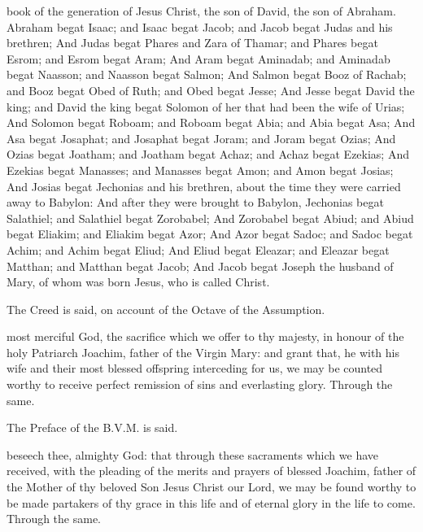  book of the generation of Jesus Christ, the son of David, the son of Abraham. Abraham begat Isaac; and Isaac begat Jacob; and Jacob begat Judas and his brethren; And Judas begat Phares and Zara of Thamar; and Phares begat Esrom; and Esrom begat Aram; And Aram begat Aminadab; and Aminadab begat Naasson; and Naasson begat Salmon; And Salmon begat Booz of Rachab; and Booz begat Obed of Ruth; and Obed begat Jesse; And Jesse begat David the king; and David the king begat Solomon of her that had been the wife of Urias; And Solomon begat Roboam; and Roboam begat Abia; and Abia begat Asa; And Asa begat Josaphat; and Josaphat begat Joram; and Joram begat Ozias; And Ozias begat Joatham; and Joatham begat Achaz; and Achaz begat Ezekias; And Ezekias begat Manasses; and Manasses begat Amon; and Amon begat Josias; And Josias begat Jechonias and his brethren, about the time they were carried away to Babylon: And after they were brought to Babylon, Jechonias begat Salathiel; and Salathiel begat Zorobabel; And Zorobabel begat Abiud; and Abiud begat Eliakim; and Eliakim begat Azor; And Azor begat Sadoc; and Sadoc begat Achim; and Achim begat Eliud; And Eliud begat Eleazar; and Eleazar begat Matthan; and Matthan begat Jacob; And Jacob begat Joseph the husband of Mary, of whom was born Jesus, who is called Christ.
\begin{rubric}
    The Creed is said, on account of the Octave of the Assumption.
\end{rubric}
\secret
{} most merciful God, the sacrifice which we offer to thy majesty, in honour of the holy Patriarch Joachim, father of the Virgin Mary: and grant that, he with his wife and their most blessed offspring interceding for us, we may be counted worthy to receive perfect remission of sins and everlasting glory. Through the same.
\begin{rubric}
    The Preface of the B.V.M. is said.
\end{rubric}
\postcommunion
{} beseech thee, almighty God: that through these sacraments which we have received, with the pleading of the merits and prayers of blessed Joachim, father of the Mother of thy beloved Son Jesus Christ our Lord, we may be found worthy to be made partakers of thy grace in this life and of eternal glory in the life to come. Through the same.


